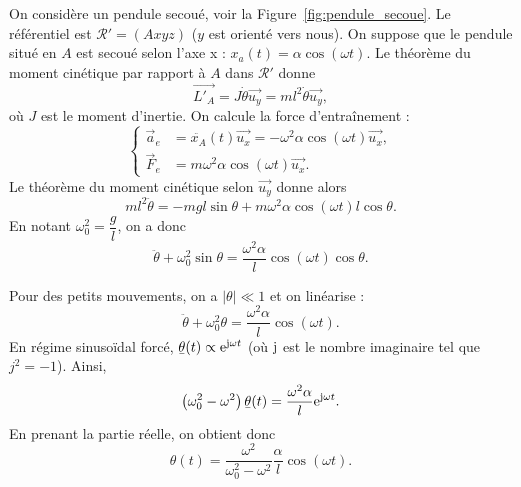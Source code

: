             On considère un pendule secoué, voir la Figure~\ref{fig:pendule_secoue}. Le référentiel est $\mathcal{R}'=(Axyz)$ ($y$ est orienté vers nous). On suppose que le pendule situé en $A$ est secoué selon l'axe x : $x_{a}(t)=\alpha\cos(\omega t)$. Le théorème du moment cinétique par rapport à $A$ dans $\mathcal{R}'$ donne 
            \begin{equation}
                \vec{L'_{A}}=J\dot{\theta}\vec{u_y}=ml^{2}\dot{\theta}\vec{u_y},
            \end{equation}
            où $J$ est le moment d'inertie. On calcule la force d'entraînement :
            \begin{equation}
                \left\lbrace
                \begin{aligned}
                    \vec{a}_e &=\ddot{x_A}(t)\vec{u_x}=-\omega^{2}\alpha\cos(\omega t)\vec{u_x},\\
                    \vec{F}_e &= m\omega^{2}\alpha\cos(\omega t)\vec{u_x}.
                \end{aligned}
                \right.
            \end{equation}
            Le théorème du moment cinétique selon $\vec{u_y}$ donne alors
            \begin{equation}
                ml^{2}\ddot{\theta}=-mgl\sin\theta+m\omega^{2}\alpha\cos(\omega t)l\cos\theta.
            \end{equation}
            En notant $\omega_{0}^{2}=\dfrac{g}{l}$, on a donc 
            \begin{equation}
                \boxed{
                    \ddot{\theta}+\omega_{0}^{2}\sin\theta=\frac{\omega^{2}\alpha}{l}\cos(\omega t)\cos\theta.
                }
            \end{equation}

            Pour des petits mouvements, on a $\left\lvert\theta\right\rvert\ll1$ et on linéarise :
            \begin{equation}
                \ddot{\theta}+\omega_{0}^{2}\theta=\frac{\omega^{2}\alpha}{l}\cos(\omega t).
            \end{equation}
            En régime sinusoïdal forcé, $\ubar{\theta}(t)\propto\e^{\j \omega t}$ (où $\mathrm{j}$ est le nombre imaginaire tel que $j^{2}=-1$). Ainsi,
            \begin{equation}
                \left(\omega_{0}^{2}-\omega^{2}\right)\ubar{\theta}(t)=\frac{\omega^{2}\alpha}{l}\e^{\j\omega t}.
            \end{equation}
            En prenant la partie réelle, on obtient donc
            \begin{equation}
                \boxed{
                    \theta(t)=\frac{\omega^{2}}{\omega_{0}^{2}-\omega^{2}}\frac{\alpha}{l}\cos(\omega t).
                }
            \end{equation}

